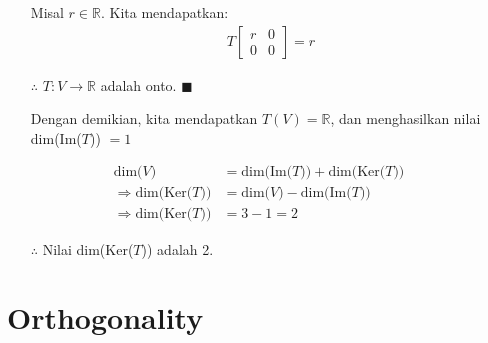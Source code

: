 \documentclass[12pt, a4paper]{scrartcl}
\begin{document}
\begin{enumerate}
\begin{enumerate}
            \begin{itemize}
                \item[] Misal $r\in \mathbb{R}$. Kita mendapatkan: 
                \begin{align*}
                    T\begin{bmatrix}
                        r&0\\0&0
                    \end{bmatrix}=r
                \end{align*}
            \end{itemize}
            \begin{itemize}
                \item[$\therefore$] $T:V\to \mathbb{R}$ adalah onto. $\blacksquare$
            \end{itemize}

            \begin{itemize}
                \item[] Dengan demikian, kita mendapatkan $T(V) = \mathbb{R}$, dan menghasilkan nilai dim(Im($T$)) $=1$
            \end{itemize}
            \begin{align*}
                \mbox{dim($V$)}&=\mbox{dim(Im($T$))}+\mbox{dim(Ker($T$))}
                \\\Rightarrow \mbox{dim(Ker($T$))} &= \mbox{dim($V$)}-\mbox{dim(Im($T$))}
                \\\Rightarrow \mbox{dim(Ker($T$))} &= 3 - 1 = 2
            \end{align*}

            \begin{itemize}
                \item[$\therefore$] Nilai dim(Ker($T$)) adalah 2.
            \end{itemize}

        \end{enumerate}
    \end{enumerate}

\section*{Orthogonality}
\end{document}
